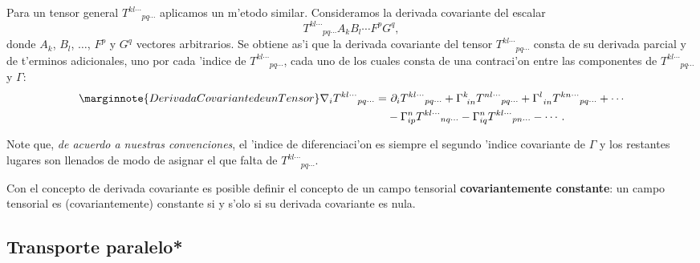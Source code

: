 Para un tensor general $T^{kl\cdots }{}_{pq\cdots }$ aplicamos un m'etodo similar. Consideramos la derivada covariante del escalar
\begin{equation}
T^{kl\cdots }{}_{pq\cdots }A_k B_l \cdots F^pG^q, \label{dinv16}
\end{equation}
donde $A_k $, $B_l $, $\dots $, $F^p$ y $G^q$ vectores arbitrarios. Se obtiene
as'i que la derivada covariante del tensor $T^{kl\cdots }{}_{pq\cdots}$ consta de su derivada parcial y de t'erminos adicionales, uno por
cada 'indice de $T^{kl\cdots }{}_{pq\cdots }$, cada uno de los cuales consta de
una contraci'on entre las componentes de $T^{kl\cdots }{}_{pq\cdots }$ y
$\Gamma$:
\begin{align}\marginnote{Derivada Covariante de un Tensor}
\nabla_iT^{kl\cdots }{}_{pq\cdots} =&\ \partial_iT^{kl\cdots
}{}_{pq\cdots}+\Gamma_{\ in}^kT^{nl\cdots}{}_{pq\cdots } +\Gamma_{\
in}^lT^{kn\cdots }{}_{pq\cdots} +\cdots \nonumber \\
&  -\Gamma_{ip}^nT^{kl\cdots}{}_{nq\cdots
}-\Gamma_{iq}^nT^{kl\cdots }{}_{pn\cdots }-\cdots . \label{dinv17}
\end{align}

Note que, \textit{de acuerdo a nuestras convenciones}, el 'indice de diferenciaci'on es siempre el segundo 'indice covariante de $\Gamma$ y los restantes lugares son llenados de modo de asignar el que falta de $T^{kl\cdots }{}_{pq\cdots }$.

Con el concepto de derivada covariante es posible definir el concepto de un
campo tensorial \textbf{covariantemente constante}: un campo tensorial es
(covariantemente) constante si y s'olo si su derivada covariante es nula.


\subsection{Transporte paralelo*}

